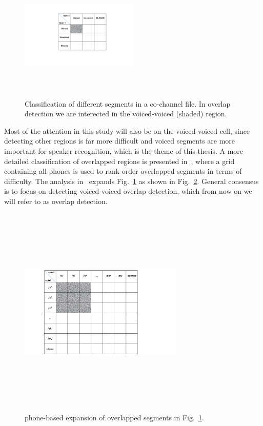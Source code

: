 \begin{figure}[h!]
	\centering
	\includegraphics[height = 2.5in, width=0.5\textwidth]{figures/morgan_v_uv_table}
	\caption{ Classification of different segments in a co-channel file. In overlap detection we are interected in 
		the voiced-voiced (shaded) region.}
	\label{fig:ch2_morgan_v_uv_table}
\end{figure}

Most of the attention in this study will also be on the voiced-voiced cell, since detecting other regions is far more difficult and voiced segments are more important for speaker recognition, which is the theme of this thesis. 
A more detailed classification of overlapped regions is presented in~\cite{nav_icassp13}, where a grid containing all phones is used to rank-order overlapped segments in terms of difficulty. 
The analysis in~\cite{nav_icassp13} expands Fig.~\ref{fig:ch2_morgan_v_uv_table} as shown in Fig.~\ref{fig:ch2_nav_v_uv_table}. 
General consensus is to focus on detecting voiced-voiced overlap detection, which from now on we will refer to as overlap detection. 

\begin{figure}[h!]
	\centering
	\includegraphics[height = 4in, width=0.7\textwidth]{figures/nav_v_uv_table}	
	\caption{ phone-based expansion of overlapped segments in Fig.~\ref{fig:ch2_morgan_v_uv_table}.}
	\label{fig:ch2_nav_v_uv_table}
\end{figure}

